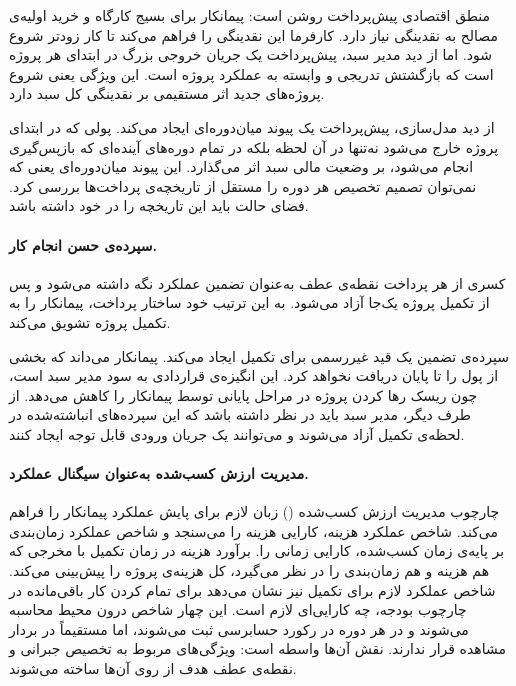 منطق اقتصادی پیش‌پرداخت روشن است: پیمانکار برای بسیج کارگاه
و خرید اولیه‌ی مصالح به نقدینگی نیاز دارد. کارفرما این نقدینگی
را فراهم می‌کند تا کار زودتر شروع شود. اما از دید مدیر سبد،
پیش‌پرداخت یک جریان خروجی بزرگ در ابتدای هر پروژه است که
بازگشتش تدریجی و وابسته به عملکرد پروژه است. این ویژگی یعنی
شروع پروژه‌های جدید اثر مستقیمی بر نقدینگی کل سبد دارد.

از دید مدل‌سازی، پیش‌پرداخت یک پیوند میان‌دوره‌ای ایجاد می‌کند.
پولی که در ابتدای پروژه خارج می‌شود نه‌تنها در آن لحظه بلکه
در تمام دوره‌های آینده‌ای که بازپس‌گیری انجام می‌شود، بر
وضعیت مالی سبد اثر می‌گذارد. این پیوند میان‌دوره‌ای یعنی
که نمی‌توان تصمیم تخصیص هر دوره را مستقل از تاریخچه‌ی
پرداخت‌ها بررسی کرد. فضای حالت  باید این تاریخچه را
در خود داشته باشد.

\paragraph{سپرده‌ی حسن انجام کار.}
کسری از هر پرداخت نقطه‌ی عطف به‌عنوان تضمین عملکرد نگه داشته
می‌شود و پس از تکمیل پروژه یک‌جا آزاد می‌شود.
به این ترتیب خود ساختار پرداخت، پیمانکار را به تکمیل پروژه تشویق
می‌کند.

سپرده‌ی تضمین یک قید غیررسمی برای تکمیل ایجاد می‌کند. پیمانکار
می‌داند که بخشی از پول را تا پایان دریافت نخواهد کرد. این
انگیزه‌ی قراردادی به سود مدیر سبد است، چون ریسک رها کردن پروژه
در مراحل پایانی توسط پیمانکار را کاهش می‌دهد. از طرف دیگر، مدیر
سبد باید در نظر داشته باشد که این سپرده‌های انباشته‌شده در
لحظه‌ی تکمیل آزاد می‌شوند و می‌توانند یک جریان ورودی قابل توجه
ایجاد کنند.

\paragraph{مدیریت ارزش کسب‌شده به‌عنوان سیگنال عملکرد.}
چارچوب مدیریت ارزش کسب‌شده () \citep{Fleming2010} زبان
لازم برای پایش عملکرد پیمانکار را فراهم می‌کند.
شاخص عملکرد هزینه، کارایی هزینه را می‌سنجد و شاخص عملکرد
زمان‌بندی بر پایه‌ی زمان کسب‌شده، کارایی زمانی را.
برآورد هزینه در زمان تکمیل با مخرجی که هم هزینه و هم زمان‌بندی را
در نظر می‌گیرد، کل هزینه‌ی پروژه را پیش‌بینی می‌کند.
شاخص عملکرد لازم برای تکمیل نیز نشان می‌دهد برای تمام کردن کار
باقی‌مانده در چارچوب بودجه، چه کارایی‌ای لازم است.
این چهار شاخص درون محیط محاسبه می‌شوند و در هر دوره در رکورد
حسابرسی ثبت می‌شوند، اما مستقیماً در بردار مشاهده قرار ندارند.
نقش آن‌ها واسطه است: ویژگی‌های مربوط به تخصیص جبرانی و نقطه‌ی عطف
هدف از روی آن‌ها ساخته می‌شوند.

